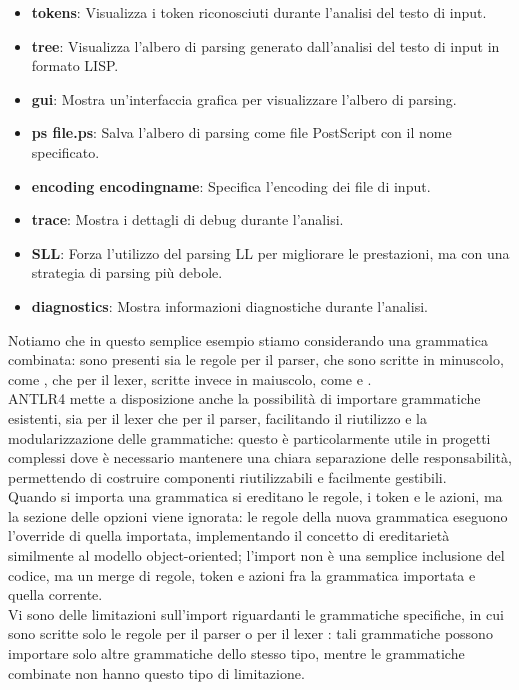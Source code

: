 \documentclass{article}
\begin{document}
\begin{itemize}
    \item \textbf{tokens}: Visualizza i token riconosciuti durante l'analisi del testo di input.
    \item \textbf{tree}: Visualizza l'albero di parsing generato dall'analisi del testo di input in formato LISP.
    \item \textbf{gui}: Mostra un'interfaccia grafica per visualizzare l'albero di parsing.
    \item \textbf{ps file.ps}: Salva l'albero di parsing come file PostScript con il nome specificato.
    \item \textbf{encoding encodingname}: Specifica l'encoding dei file di input.
    \item \textbf{trace}: Mostra i dettagli di debug durante l'analisi.
    \item \textbf{SLL}: Forza l'utilizzo del parsing LL per migliorare le prestazioni, ma con una strategia di parsing più debole.
    \item \textbf{diagnostics}: Mostra informazioni diagnostiche durante l'analisi.
\end{itemize}
\noindent
Notiamo che in questo semplice esempio stiamo considerando una
grammatica combinata: sono presenti sia le regole per il parser, che sono scritte in minuscolo, come , che per il lexer, scritte invece in maiuscolo, come  e .\\ ANTLR4 mette a disposizione anche la possibilità di importare grammatiche esistenti, sia per il lexer che per il  parser, facilitando il riutilizzo e la modularizzazione delle grammatiche: questo è particolarmente utile in progetti complessi dove è necessario mantenere una chiara separazione delle responsabilità, permettendo di costruire componenti riutilizzabili e facilmente gestibili.\\
\noindent
Quando si importa una grammatica si ereditano le regole, i token e le azioni, ma la sezione delle opzioni viene ignorata: le regole della nuova grammatica eseguono l'override di quella importata, implementando il concetto di ereditarietà similmente al modello object-oriented; l'import non è una semplice inclusione del codice, ma un merge di regole, token e azioni fra la grammatica importata e quella corrente.\\
\noindent
Vi sono delle limitazioni sull'import riguardanti le grammatiche specifiche, in cui sono scritte solo le regole per il parser o per il lexer : tali grammatiche possono importare solo altre grammatiche dello stesso tipo, mentre le grammatiche combinate non hanno questo tipo di limitazione.
\end{document}
